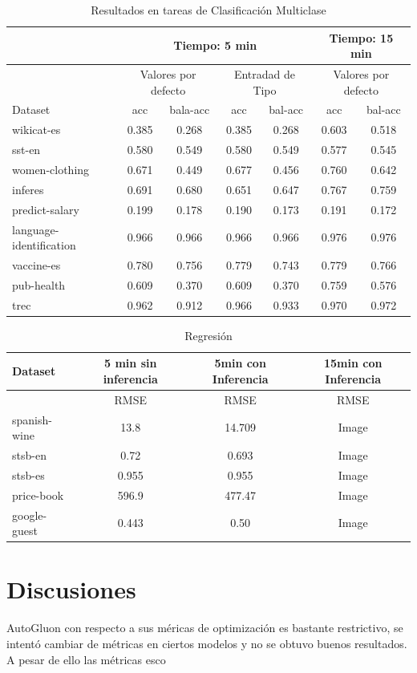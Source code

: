 \begin{table}[H]
  \centering
  \resizebox{15cm}{!} {
  \begin{tabular}{|l|cccccc|}
  \hline
          & \multicolumn{4}{p{8cm}|}{Tiempo: 5 min}  & \multicolumn{2}{p{4cm}|}{Tiempo: 15 min}\\  \hline
          & \multicolumn{2}{p{4cm}|}{Valores por defecto} & \multicolumn{2}{p{4cm}|}{Entradad de Tipo} & \multicolumn{2}{p{4cm}|}{Valores por defecto}\\ \hline
  Dataset & acc & bala-acc & acc  & bal-acc & acc & bal-acc  \\ \hline
  wikicat-es              & 0.385 & 0.268 & 0.385 & 0.268 & 0.603 & 0.518 \\
  sst-en                  & 0.580 & 0.549 & 0.580 & 0.549 & 0.577 & 0.545 \\
  women-clothing          & 0.671 & 0.449 & 0.677 & 0.456 & 0.760 & 0.642 \\ 
  inferes                 & 0.691 & 0.680 & 0.651 & 0.647 & 0.767 & 0.759 \\
  predict-salary          & 0.199 & 0.178 & 0.190 & 0.173 & 0.191 & 0.172 \\
  language-identification & 0.966 & 0.966 & 0.966 & 0.966 & 0.976 & 0.976 \\
  vaccine-es              & 0.780 & 0.756 & 0.779 & 0.743 & 0.779 & 0.766 \\
  pub-health              & 0.609 & 0.370 & 0.609 & 0.370 & 0.759 & 0.576 \\ 
  trec                    & 0.962 & 0.912 & 0.966 & 0.933 & 0.970 & 0.972 \\ \hline

  \end{tabular}
  \caption{Resultados en tareas de Clasificación Multiclase}
  \label{fig:class-multi}
  }
\end{table}

\begin{table}[H]
  \centering
  \resizebox{15cm}{!} {
  \begin{tabular}{|l|c|c|c|}
  \hline
  Dataset & 5 min sin inferencia  & 5min con Inferencia & 15min con Inferencia \\ \hline
               & RMSE   & RMSE  & RMSE  \\ \hline
  spanish-wine & 13.8   & 14.709 & Image  \\
  stsb-en      & 0.72   & 0.693  & Image  \\
  stsb-es      & 0.955  & 0.955  & Image  \\ 
  price-book   & 596.9  & 477.47 &  Image  \\
  google-guest & 0.443  & 0.50   &  Image  \\ \hline

\end{tabular}
  \caption{Regresión}
  \label{fig:regression}
  }
\end{table}

\section{Discusiones}\label{section:discussions}
AutoGluon con respecto a sus méricas
de optimización es bastante restrictivo, se intentó cambiar de métricas en ciertos modelos y no se obtuvo buenos resultados. A pesar de ello las métricas esco